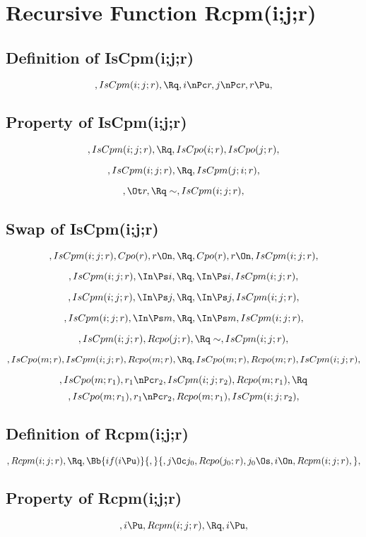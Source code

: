 \chapter{Recursive Function Rcpm(i;j;r)}

\section{Definition of IsCpm(i;j;r)}
\[,IsCpm(i;j;r), \Rq , i \nPc r, j \nPc r, r \Pu, \]

\bigskip
\bigskip
\section{Property of IsCpm(i;j;r)}

\[,IsCpm(i;j;r), \Rq , IsCpo(i;r), IsCpo(j;r), \]

\[,IsCpm(i;j;r), \Rq ,IsCpm(j;i;r), \]

\[, \Ot r, \Rq \sim, IsCpm(i;j;r), \]


\bigskip
\bigskip
\section{Swap of IsCpm(i;j;r)}
\[, IsCpm(i;j;r), Cpo(r), r \On, \Rq , Cpo(r), r \On, IsCpm(i;j;r),\]

\[, IsCpm(i;j;r), \In \Ps i, \Rq , \In \Ps i, IsCpm(i;j;r), \]

\[, IsCpm(i;j;r), \In \Ps j, \Rq , \In \Ps j, IsCpm(i;j;r), \]

\[, IsCpm(i;j;r), \In \Ps m, \Rq , \In \Ps m, IsCpm(i;j;r), \]


\[, IsCpm(i;j;r), Rcpo(j;r), \Rq \sim, IsCpm(i;j;r),\]

\[, IsCpo(m;r), IsCpm(i;j;r), Rcpo(m;r), \Rq , IsCpo(m;r), Rcpo(m;r), IsCpm(i;j;r), \]

\[, IsCpo(m;r_1), r_1 \nPc r_2, IsCpm(i;j;r_2), Rcpo(m;r_1), \Rq \]
\[, IsCpo(m;r_1), r_1 \nPc r_2, Rcpo(m;r_1), IsCpm(i;j;r_2), \]






\bigskip
\bigskip
\section{Definition of Rcpm(i;j;r)}
\[, Rcpm(i;j;r), \Rq , \Bb{if(i \Pu)}{,}{, j \Oc j_0, Rcpo(j_0;r), j_0 \Os, i \On, Rcpm(i;j;r), },\]




\bigskip
\bigskip
\section{Property of Rcpm(i;j;r)}
\[, i \Pu, Rcpm(i;j;r), \Rq , i \Pu,\]

